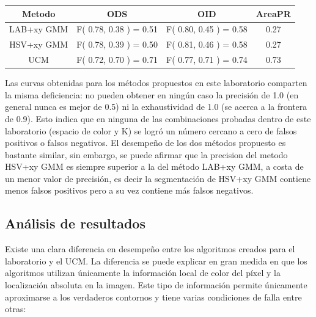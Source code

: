 \documentclass[10pt,twocolumn,letterpaper]{article}
\begin{document}
\begin{table}[t]
\centering
\begin{tabular}{c | c | c | c }
Metodo & ODS & OID & AreaPR  \\
\hline	
LAB+xy GMM & F( 0.78, 0.38 ) = 0.51  & F( 0.80, 0.45 ) = 0.58 & 0.27 \\
HSV+xy GMM & F( 0.78, 0.39 ) = 0.50  &  F( 0.81, 0.46 ) = 0.58 &  0.27\\
UCM & F( 0.72, 0.70 ) = 0.71  & F( 0.77, 0.71 ) = 0.74 &  0.73\\
\end{tabular}
\label{table:thetable}
\end{table}


Las curvas obtenidas para los métodos propuestos en este laboratorio comparten la misma deficiencia:  no pueden obtener en ningún caso la precisión de 1.0 (en general nunca es mejor de 0.5) ni la exhaustividad de 1.0 (se acerca a la frontera de 0.9). Esto indica que en ninguna de las combinaciones probadas dentro de este laboratorio (espacio de color y K) se logró un número cercano a cero de falsos positivos o falsos negativos. El desempeño de los dos métodos propuesto es bastante similar, sin embargo, se puede afirmar que la precision del metodo HSV+xy GMM es siempre superior a la del método LAB+xy GMM, a costa de un menor valor de precisión, es decir la segmentación de HSV+xy GMM contiene menos falsos positivos pero a su vez contiene más falsos negativos.


\subsection{Análisis de resultados}

Existe una clara diferencia en desempeño entre los algoritmos creados para el laboratorio y el UCM. La diferencia se puede explicar en gran medida en que los algoritmos utilizan únicamente la información local de color del píxel y la localización absoluta en la imagen. Este tipo de información permite únicamente aproximarse a los verdaderos contornos y tiene varias condiciones de falla entre otras:
\end{document}
